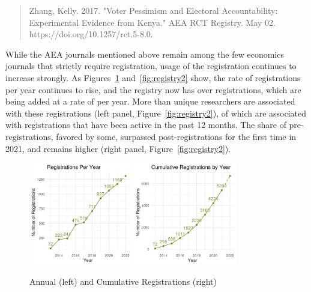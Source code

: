 \begin{quote}\footnotesize
    Zhang, Kelly. 2017. "Voter Pessimism and Electoral Accountability: Experimental Evidence from Kenya." AEA RCT Registry. May 02. https://doi.org/10.1257/rct.5-8.0.
\end{quote}


While the AEA journals mentioned above remain among the few economics journals that strictly require registration, usage of the registration continues to increase strongly. As Figures~\ref{fig:registry1} and~\ref{fig:registry2} show, the rate of registrations per year continues to rise, and the registry now has over \regscumul{} registrations, which are being added at a rate of \regsyearly{} per year.  More than \registeredusers{} unique researchers are associated with these registrations (left panel, Figure~\ref{fig:registry2}), \activeusers{} of which are associated with registrations that have been active in the past 12 months. The share of pre-registrations, favored by some, surpassed post-registrations for the first time in 2021, and remains higher (right panel, Figure~\ref{fig:registry2}). 


\begin{figure}
\centering
\includegraphics[width=0.4\textwidth]{data/registry/AEA_registryanalysis-main/Output/reg_pre_year.png}
\includegraphics[width=0.4\textwidth]{data/registry/AEA_registryanalysis-main/Output/reg_cumulative.png}
\caption{Annual (left) and Cumulative Registrations (right) }
    \label{fig:registry1}
\end{figure}

